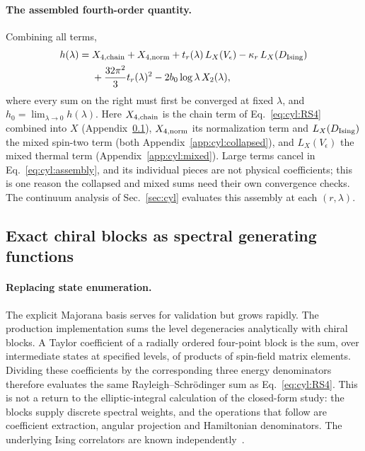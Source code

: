\documentclass[11pt,a4paper]{article}
\numberwithin{equation}{section}
\begin{document}
\paragraph{The assembled fourth-order quantity.} Combining all terms,
\begin{equation}
\begin{aligned}
 h(\lambda)={}&X_{4,\rm chain}+X_{4,\rm norm}+t_r(\lambda)\,L_X(V_\epsilon)-\kappa_r\,L_X(D_{\rm Ising})\\
 &+\frac{32\pi^2}{3}t_r(\lambda)^2-2b_0\log\lambda\,X_2(\lambda),
\end{aligned}
\label{eq:cyl:assembly}
\end{equation}
where every sum on the right must first be converged at fixed $\lambda$, and $h_0=\lim_{\lambda\to0}h(\lambda)$. Here
$X_{4,\rm chain}$ is the chain term of Eq.~\eqref{eq:cyl:RS4} combined into $X$ (Appendix~\ref{app:cyl:blocks}),
$X_{4,\rm norm}$ its normalization term and $L_X(D_{\rm Ising})$ the mixed spin-two term (both
Appendix~\ref{app:cyl:collapsed}), and $L_X(V_\epsilon)$ the mixed thermal term (Appendix~\ref{app:cyl:mixed}). Large terms
cancel in Eq.~\eqref{eq:cyl:assembly}, and its individual pieces are not physical coefficients; this is one reason the
collapsed and mixed sums need their own convergence checks. The continuum analysis of Sec.~\ref{sec:cyl} evaluates
this assembly at each $(r,\lambda)$.

\subsection{Exact chiral blocks as spectral generating functions}\label{app:cyl:blocks}
\paragraph{Replacing state enumeration.} The explicit Majorana basis serves for validation but grows rapidly. The
production implementation sums the level degeneracies analytically with chiral blocks. A Taylor coefficient of a
radially ordered four-point block is the sum, over intermediate states at specified levels, of products of spin-field
matrix elements. Dividing these coefficients by the corresponding three energy denominators therefore evaluates the
same Rayleigh--Schr\"odinger sum as Eq.~\eqref{eq:cyl:RS4}. This is not a return to the elliptic-integral calculation
of the closed-form study: the blocks supply discrete spectral weights, and the operations that follow are coefficient
extraction, angular projection and Hamiltonian denominators. The underlying Ising correlators are known
independently~\cite{Ardonne:2010zz}.
\end{document}
